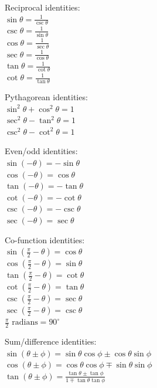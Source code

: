 \documentclass[10pt,landscape,a4paper]{article}
\begin{document}
\begin{multicols*}{5}
  Reciprocal identities: \\
  \(\sin \theta = \frac{1}{\csc \theta}\) \\
  \(\csc \theta = \frac{1}{\sin \theta}\) \\
  \(\cos \theta = \frac{1}{\sec \theta}\) \\
  \(\sec \theta = \frac{1}{\cos \theta}\) \\
  \(\tan \theta = \frac{1}{\cot \theta}\) \\
  \(\cot \theta = \frac{1}{\tan \theta}\)

  Pythagorean identities: \\
  \(\sin^2 \theta + \cos^2 \theta = 1\) \\
  \(\sec^2 \theta - \tan^2 \theta = 1\) \\
  \(\csc^2 \theta - \cot^2 \theta = 1\)

  Even/odd identities: \\
  \(\sin(- \theta) = - \sin \theta\) \\
  \(\cos (- \theta) = \cos \theta\) \\
  \(\tan(- \theta) = - \tan \theta\) \\
  \(\cot (- \theta) = - \cot \theta\) \\
  \(\csc(- \theta) = - \csc \theta\) \\
  \(\sec (- \theta) = \sec \theta\)

  Co-function identities: \\
  \(\sin \left(\frac{\pi}{2} - \theta \right) = \cos \theta\) \\
  \(\cos \left(\frac{\pi}{2} - \theta\right) = \sin \theta \) \\
  \(\tan \left(\frac{\pi}{2} - \theta \right) = \cot \theta\) \\
  \(\cot \left(\frac{\pi}{2} - \theta\right) = \tan \theta \) \\
  \(\csc \left(\frac{\pi}{2} - \theta \right) = \sec \theta\) \\
  \(\sec \left(\frac{\pi}{2} - \theta\right) = \csc \theta \) \\
  \(\frac{\pi}{2} \text{ radians} = 90^{\circ}\)

  Sum/difference identities: \\
  \(\sin (\theta \pm \phi) = \sin \theta \cos \phi \pm \cos \theta \sin \phi\) \\
  \(\cos (\theta \pm \phi) = \cos \theta \cos \phi \mp \sin \theta \sin \phi\) \\
  \(\tan (\theta \pm \phi) = \frac{\tan \theta \pm \tan \phi}{1 \mp \tan \theta \tan \phi}\)


\end{multicols*}
\end{document}
